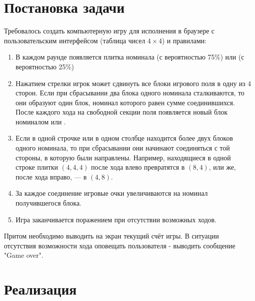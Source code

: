 \documentclass[a4paper,12pt]{article}
\newcommand{\lk}{\guillemotleft}
\newcommand{\rk}{\guillemotright}
\begin{document}

\setcounter{page}{2}

\tableofcontents
\justify
\section {Постановка задачи}
Требовалось создать компьютерную игру для исполнения в браузере с пользовательским интерфейсом (таблица чисел $4\times4$) и правилами:
\begin{enumerate}
\item{} В каждом раунде появляется плитка номинала \lk2\rk (с вероятностью 75\%) или \lk4\rk (с вероятностью 25\%)
\item{} Нажатием стрелки игрок может сдвинуть все блоки игрового поля в одну из 4 сторон. Если при сбрасывании два блока одного номинала сталкиваются, то они образуют один блок, номинал которого равен сумме соединившихся. После каждого хода на свободной секции поля появляется новый блок номиналом \lk2\rk или \lk4\rk.
\item{} Если в одной строчке или в одном столбце находится более двух блоков одного номинала, то при сбрасывании они начинают соединяться с той стороны, в которую были направлены. Например, находящиеся в одной строке плитки $(4, 4, 4)$ после хода влево превратятся в $(8, 4)$, или же, после хода вправо, — в $(4, 8)$.
\item{} За каждое соединение игровые очки увеличиваются на номинал получившегося блока.
\item{}Игра заканчивается поражением при отсутствии возможных ходов.
\end{enumerate}
Притом необходимо выводить на экран текущий счёт игры. В ситуации отсутствия возможности хода оповещать пользователя  - выводить сообщение "Game over".


\section {Реализация}
\end{document}
